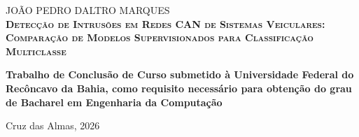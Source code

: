 
\begin{center}

    {\large \centering JOÃO PEDRO DALTRO MARQUES\\}
    \vspace{8cm}
    {\Large \textsc\textbf{{Detecção de Intrusões em Redes CAN de Sistemas
Veiculares: Comparação de Modelos Supervisionados para
Classificação Multiclasse
} }\\}
    \vspace{1cm}
    \hspace{.45\linewidth}
    \begin{minipage}{.50\linewidth}

            \textbf{Trabalho de Conclusão de Curso submetido à Universidade Federal do Recôncavo da Bahia, como requisito 
            necessário para obtenção do grau de Bacharel em Engenharia da Computação}

           
    
    \end{minipage}

    \vspace{2cm}
    \vfill
    {\large Cruz das Almas, 2026}
\end{center}

